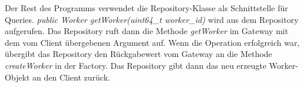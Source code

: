 \documentclass[a4paper,12pt]{article}
\begin{document}
Der Rest des Programms verwendet die Repository-Klasse als Schnittstelle für Queries. \textit{public Worker getWorker(uint64\_t worker\_id)} wird aus dem Repository aufgerufen. Das Repository ruft dann die Methode \textit{getWorker} im Gateway mit dem vom Client übergebenen Argument auf. Wenn die Operation erfolgreich war, übergibt das Repository den Rückgabewert vom Gateway an die Methode \textit{createWorker} in der Factory. Das Repository gibt dann das neu erzeugte Worker-Objekt an den Client zurück.





\printnoidxglossaries
\end{document}
